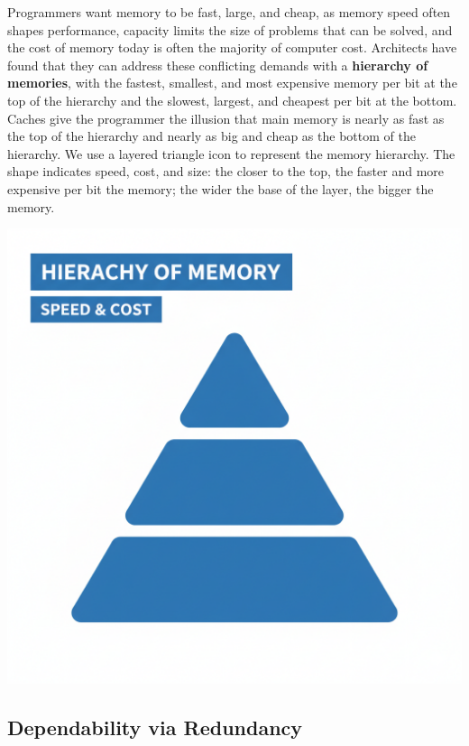 \documentclass[a4paper,10pt]{article}
\begin{document}
\begin{minipage}[t]{0.7\linewidth}
Programmers want memory to be fast, large, and cheap, as memory speed often shapes performance, capacity limits the size of problems that can be solved, and the cost of memory today is often the majority of computer cost. Architects have found that they can address these conflicting demands with a \textbf{hierarchy of memories}, with the fastest, smallest, and most expensive memory per bit at the top of the hierarchy and the slowest, largest, and cheapest per bit at the bottom. Caches give the programmer the illusion that main memory is nearly as fast as the top of the hierarchy and nearly as big and cheap as the bottom of the hierarchy. We use a layered triangle icon to represent the memory hierarchy. The shape indicates speed, cost, and size: the closer to the top, the faster and more expensive per bit the memory; the wider the base of the layer, the bigger the memory.
\end{minipage}
\hfill
\begin{minipage}[t]{0.28\linewidth}
    \centering
    \includegraphics[width=\linewidth]{resources/8_great_ideas_of_computer_architecture/hierarchy_of_mem.png}
\end{minipage}

\bigskip

\subsection{Dependability via Redundancy}
\end{document}
